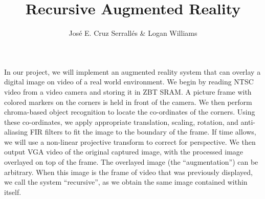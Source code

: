 \documentclass[11pt]{article}
\title{Recursive Augmented Reality}
\author{Jos\'{e} E. Cruz Serrall\'{e}s \& Logan Williams}
\date{}
\begin{document}
\maketitle


In our project, we will implement an augmented reality system that can overlay a digital image on video of a real world environment. We begin by reading NTSC video from a video camera and storing it in ZBT SRAM. A picture frame with colored markers on the corners is held in front of the camera. We then perform chroma-based object recognition to locate the co-ordinates of the corners. Using these co-ordinates, we apply appropriate translation, scaling, rotation, and anti-aliasing FIR filters to fit the image to the boundary of the frame. If time allows, we will use a non-linear projective transform to correct for perspective. We then output VGA video of the original captured image, with the processed image overlayed on top of the frame. The overlayed image (the ``augmentation'') can be arbitrary. When this image is the frame of video that was previously displayed, we call the system ``recursive'', as we obtain the same image contained within itself.
\end{document}
